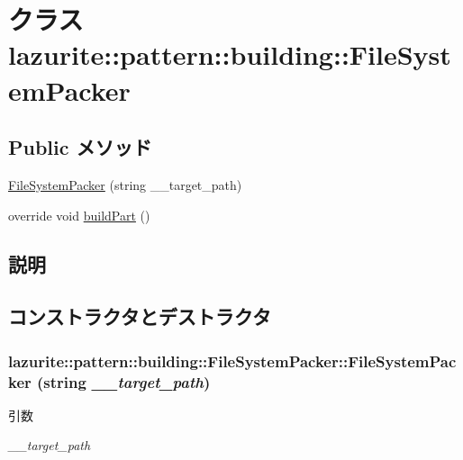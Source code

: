 \hypertarget{classlazurite_1_1pattern_1_1building_1_1_file_system_packer}{
\section{クラス lazurite::pattern::building::FileSystemPacker}
\label{classlazurite_1_1pattern_1_1building_1_1_file_system_packer}
}
\subsection*{Public メソッド}
\begin{DoxyCompactItemize}
\item 
\hyperlink{classlazurite_1_1pattern_1_1building_1_1_file_system_packer_a5585f59a596110231c380675b7bb3e12}{FileSystemPacker} (string \_\-\_\-target\_\-path)
\item 
override void \hyperlink{classlazurite_1_1pattern_1_1building_1_1_file_system_packer_a1cc7522742142d924507f0ba288eaa07}{buildPart} ()
\end{DoxyCompactItemize}


\subsection{説明}


\subsection{コンストラクタとデストラクタ}
\hypertarget{classlazurite_1_1pattern_1_1building_1_1_file_system_packer_a5585f59a596110231c380675b7bb3e12}{
\subsubsection[{FileSystemPacker}]{\setlength{\rightskip}{0pt plus 5cm}lazurite::pattern::building::FileSystemPacker::FileSystemPacker (string {\em \_\-\_\-target\_\-path})}}
\label{classlazurite_1_1pattern_1_1building_1_1_file_system_packer_a5585f59a596110231c380675b7bb3e12}

\begin{DoxyParams}{引数}
\item[{\em \_\-\_\-target\_\-path}]\end{DoxyParams}


